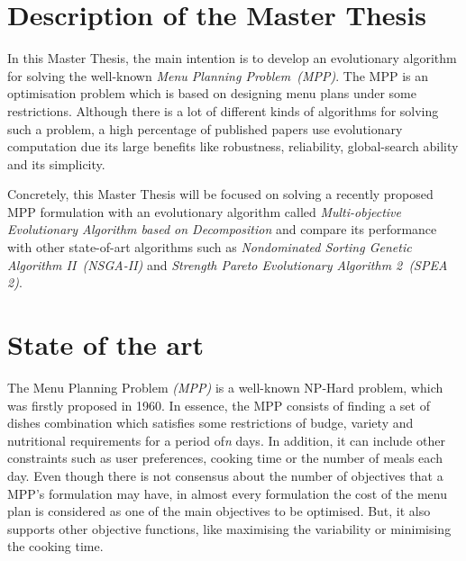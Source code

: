 \section{Description of the Master Thesis}
In this Master Thesis, the main intention is to develop an evolutionary algorithm for solving the well-known \textit{Menu Planning Problem~(MPP)}. The MPP is an optimisation problem which is based on designing menu plans under some restrictions. Although there is a lot of different kinds of algorithms for solving such a problem, a high percentage of published papers use evolutionary computation due its large benefits like robustness, reliability, global-search ability and its simplicity\cite{SELJAK2009414, Moreira2018, Kahraman:2005:HDM:1102256.1102345, Kashima2009, 7257195}. 

Concretely, this Master Thesis will be focused on solving a recently proposed MPP formulation with an evolutionary algorithm called \textit{Multi-objective Evolutionary Algorithm based on Decomposition}\cite{Zhang2007} and compare its performance with other state-of-art algorithms such as \textit{Nondominated Sorting Genetic Algorithm II~(NSGA-II)}\cite{996017} and \textit{Strength Pareto Evolutionary Algorithm 2~(SPEA 2)}\cite{Laumanns2001SPEA2}.

\section{State of the art}

The Menu Planning Problem \textit{(MPP)} is a well-known NP-Hard problem, which was firstly proposed in 1960\cite{Ngo2016}. In essence, the MPP consists of finding a set of dishes combination which satisfies some restrictions of budge, variety and nutritional requirements for a period of\textit{n} days. In addition, it can include other constraints such as user preferences, cooking time or the number of meals each day.
Even though there is not consensus about the number of objectives that a MPP's formulation may have, in almost every formulation the cost of the menu plan is considered as one of the main objectives to be optimised\cite{Ngo2016, Moreira2018}. But, it also supports other objective functions, like maximising the variability or minimising the cooking time.

